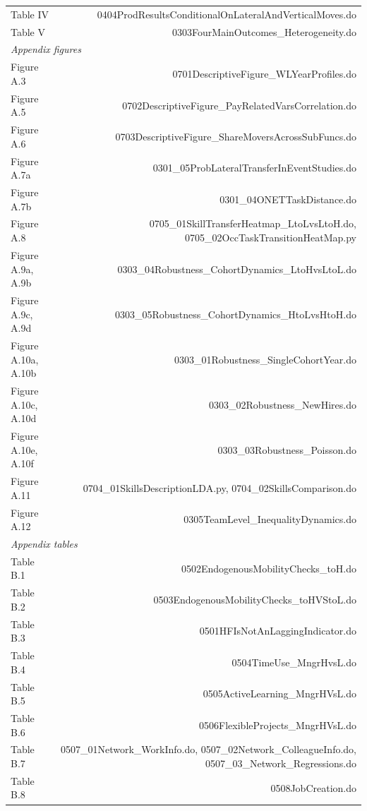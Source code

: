 \documentclass[12pt]{article}
\theoremstyle{definition}
\begin{document}
\begin{table}[H]
{\begin{tabular}{lr}
        Table IV & 0404ProdResultsConditionalOnLateralAndVerticalMoves.do \\
        Table V & 0303FourMainOutcomes\_Heterogeneity.do \\
        \toprule
        \multicolumn{2}{l}{\emph{Appendix figures}} \\
        \toprule
        Figure A.3 & 0701DescriptiveFigure\_WLYearProfiles.do \\
        Figure A.5 & 0702DescriptiveFigure\_PayRelatedVarsCorrelation.do \\
        Figure A.6 & 0703DescriptiveFigure\_ShareMoversAcrossSubFuncs.do \\
        Figure A.7a & 0301\_05ProbLateralTransferInEventStudies.do \\
        Figure A.7b & 0301\_04ONETTaskDistance.do \\
        Figure A.8 & 0705\_01SkillTransferHeatmap\_LtoLvsLtoH.do, 0705\_02OccTaskTransitionHeatMap.py \\
        Figure A.9a, A.9b & 0303\_04Robustness\_CohortDynamics\_LtoHvsLtoL.do \\
        Figure A.9c, A.9d & 0303\_05Robustness\_CohortDynamics\_HtoLvsHtoH.do \\
        Figure A.10a, A.10b & 0303\_01Robustness\_SingleCohortYear.do \\
        Figure A.10c, A.10d & 0303\_02Robustness\_NewHires.do \\
        Figure A.10e, A.10f & 0303\_03Robustness\_Poisson.do \\
        Figure A.11 & 0704\_01SkillsDescriptionLDA.py, 0704\_02SkillsComparison.do \\
        Figure A.12 & 0305TeamLevel\_InequalityDynamics.do \\
        \toprule
        \multicolumn{2}{l}{\emph{Appendix tables}} \\
        \toprule
        Table B.1 & 0502EndogenousMobilityChecks\_toH.do \\
        Table B.2 & 0503EndogenousMobilityChecks\_toHVStoL.do \\
        Table B.3 & 0501HFIsNotAnLaggingIndicator.do \\
        Table B.4 & 0504TimeUse\_MngrHvsL.do \\
        Table B.5 & 0505ActiveLearning\_MngrHVsL.do \\
        Table B.6 & 0506FlexibleProjects\_MngrHVsL.do \\
        Table B.7 & 0507\_01Network\_WorkInfo.do, 0507\_02Network\_ColleagueInfo.do, 0507\_03\_Network\_Regressions.do \\ 
        Table B.8 & 0508JobCreation.do \\
        \bottomrule
    \end{tabular}
    }
    \label{tab_mapping}
\end{table}
\end{document}
